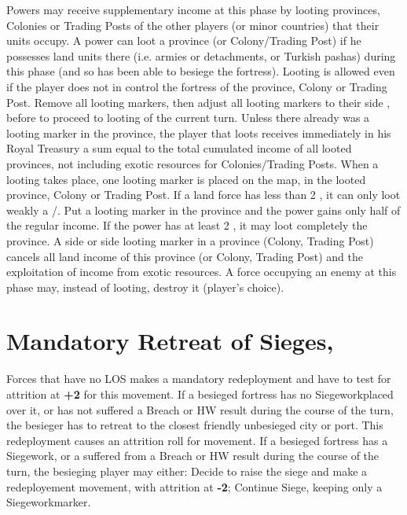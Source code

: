 Powers may receive supplementary income at this phase by looting provinces,
Colonies or Trading Posts of the other players (or minor countries) that their
units occupy.
\aparag A power can loot a province (or Colony/Trading Post) if he possesses
land units there (i.e. armies or detachments, or Turkish pashas) during this
phase (and so has been able to besiege the fortress).  Looting is allowed even
if the player does not in control the fortress of the province, Colony or
Trading Post.
Remove all \Facemoins looting markers, then adjust all \Faceplus looting
markers to their side \Facemoins, before to proceed to looting of the current
turn.
Unless there already was a looting marker in the province, the player that
loots receives immediately in his Royal Treasury a sum equal to the total
cumulated income of all looted provinces, not including exotic resources for
Colonies/Trading Posts.
When a looting takes place, one looting marker \Faceplus is placed on the map,
in the looted province, Colony or Trading Post.
If a land force has less than 2 \LD, it can only loot weakly a \COL/\TP.  Put
a \Facemoins looting marker in the province and the power gains only half of
the regular income.  If the power has at least 2 \LD, it may loot completely
the province.
A side \Faceplus or side \Facemoins looting marker in a province (Colony,
Trading Post) cancels all land income of this province (or Colony, Trading
Post) and the exploitation of income from exotic resources.
A force occupying an enemy \TP at this phase may, instead of looting, destroy
it (player's choice).



\section{Mandatory Retreat of Sieges, \Presidios}

 Forces that have no LOS makes a mandatory redeployment
and have to test for attrition at {\bf +2} for this movement.
If a besieged fortress has no Siegework\faceplus placed over it, or has not
suffered a Breach or HW result during the course of the turn, the besieger has
to retreat to the closest friendly unbesieged city or port. This redeployment
causes an attrition roll for movement.
If a besieged fortress has a Siegework\faceplus, or a suffered from a Breach
or HW result during the course of the turn, the besieging player may either:
\bparag Decide to raise the siege and make a redeployement movement, with
attrition at {\bf -2};
\bparag Continue Siege, keeping only a Siegework\facemoins marker.

